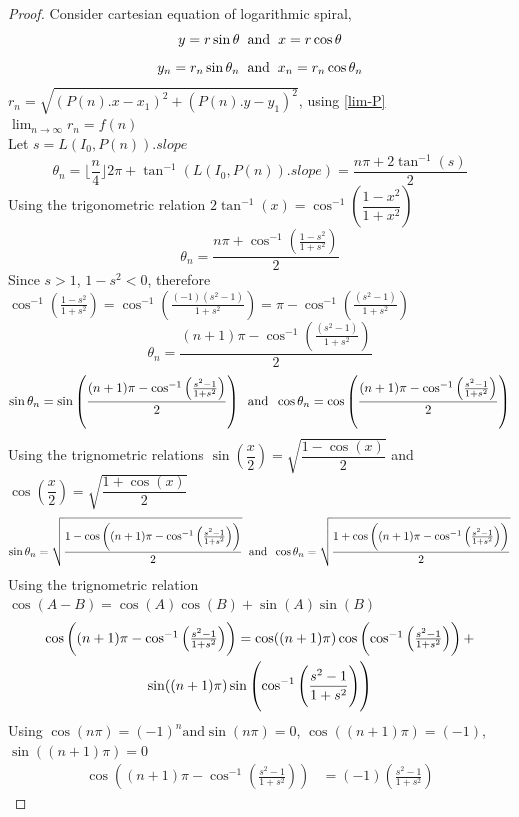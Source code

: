\documentclass{article}
\begin{document}
\begin{proof}
Consider cartesian equation of logarithmic spiral, $$y = r\sin{\theta} \hspace{2mm}\text{and}\hspace{2mm}x = r\cos{\theta}$$
$$y_n = r_n\sin{\theta_n} \hspace{2mm}\text{and}\hspace{2mm}x_n = r_n\cos{\theta_n}$$
$r_n = \sqrt{(P(n).x - x_1)^2 + (P(n).y - y_1)^2}$, using \ref{lim-P} $\lim_{n \to \infty} r_n = f(n)$\\
Let $s = L(I_0, P(n)).slope$
$$\theta_n = \lfloor\dfrac{n}{4}\rfloor 2\pi + \tan^{-1}(L(I_0, P(n)).slope) = \dfrac{n\pi + 2\tan^{-1}(s)}{2}$$
Using the trigonometric relation $2\tan^{-1}(x) = \cos^{-1}\left(\dfrac{1-x^2}{1+x^2}\right)$
$$\theta_n = \dfrac{n\pi + \cos^{-1}\left(\frac{1-s^2}{1+s^2}\right)}{2}$$
Since $s > 1$, $1 - s^2 < 0$, therefore $\cos^{-1}\left(\frac{1-s^2}{1+s^2}\right) = \cos^{-1}\left(\frac{(-1)(s^2-1)}{1+s^2}\right) = \pi - \cos^{-1}\left(\frac{(s^2-1)}{1+s^2}\right)$
$$\theta_n = \dfrac{(n+1)\pi - \cos^{-1}\left(\frac{(s^2-1)}{1+s^2}\right)}{2}$$
$$\sin\theta_n = \sin\left(\dfrac{(n+1)\pi - \cos^{-1}\left(\frac{s^2-1}{1+s^2}\right)}{2}\right)\hspace{2mm}\text{and}\hspace{2mm}\cos\theta_n = \cos\left(\dfrac{(n+1)\pi - \cos^{-1}\left(\frac{s^2-1}{1+s^2}\right)}{2}\right)$$
Using the trignometric relations $\sin\left(\dfrac{x}{2}\right) = \sqrt{\dfrac{1 - \cos(x)}{2}}$ and $\cos\left(\dfrac{x}{2}\right) = \sqrt{\dfrac{1 + \cos(x)}{2}}$
$$\sin\theta_n = \sqrt{\dfrac{1 - \cos\left((n+1)\pi - \cos^{-1}\left(\frac{s^2-1}{1+s^2}\right)\right)}{2}}\hspace{2mm}\text{and}\hspace{2mm}\cos\theta_n = \sqrt{\dfrac{1 + \cos\left((n+1)\pi - \cos^{-1}\left(\frac{s^2-1}{1+s^2}\right)\right)}{2}}$$
Using the trignometric relation $\cos(A-B) = \cos(A)\cos(B)+\sin(A)\sin(B)$
\begin{multline}
	$$\cos\left((n+1)\pi - \cos^{-1}\left(\frac{s^2-1}{1+s^2}\right)\right)=\cos((n+1)\pi)\cos\left(\cos^{-1}\left(\frac{s^2-1}{1+s^2}\right)\right)+\\ \sin((n+1)\pi)\sin\left(\cos^{-1}\left(\frac{s^2-1}{1+s^2}\right)\right)$$
\end{multline}
Using $\cos(n\pi) = (-1)^n\text{and}\sin(n\pi) = 0$, $\cos((n+1)\pi) = (-1)$, $\sin((n+1)\pi) = 0$
\begin{align*}
	\cos\left((n+1)\pi - \cos^{-1}\left(\frac{s^2-1}{1+s^2}\right)\right) &= (-1)\left(\frac{s^2-1}{1+s^2}\right)

\end{align*}
\end{proof}
\end{document}
